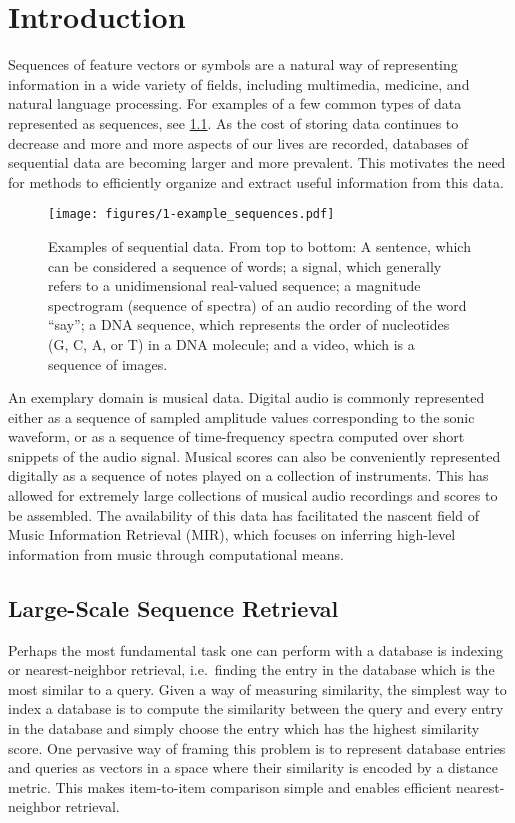 \chapter{Introduction}

Sequences of feature vectors or symbols are a natural way of representing information in a wide variety of fields, including multimedia, medicine, and natural language processing.
For examples of a few common types of data represented as sequences, see \cref{fig:example_sequences}.
As the cost of storing data continues to decrease and more and more aspects of our lives are recorded, databases of sequential data are becoming larger and more prevalent.
This motivates the need for methods to efficiently organize and extract useful information from this data.

\begin{figure}
  \texttt{[image: figures/1-example\_sequences.pdf]}
  \caption[Examples of sequential data]{Examples of sequential data.  From top to bottom: A sentence, which can be considered a sequence of words; a signal, which generally refers to a unidimensional real-valued sequence; a magnitude spectrogram (sequence of spectra) of an audio recording of the word ``say''; a DNA sequence, which represents the order of nucleotides (G, C, A, or T) in a DNA molecule; and a video, which is a sequence of images.}
  \label{fig:example_sequences}
\end{figure}

An exemplary domain is musical data.
Digital audio is commonly represented either as a sequence of sampled amplitude values corresponding to the sonic waveform, or as a sequence of time-frequency spectra computed over short snippets of the audio signal.
Musical scores can also be conveniently represented digitally as a sequence of notes played on a collection of instruments.
This has allowed for extremely large collections of musical audio recordings and scores to be assembled.
The availability of this data has facilitated the nascent field of Music Information Retrieval (MIR), which focuses on inferring high-level information from music through computational means.

\cite{}

\section{Large-Scale Sequence Retrieval}

Perhaps the most fundamental task one can perform with a database is indexing or nearest-neighbor retrieval, i.e.\ finding the entry in the database which is the most similar to a query.
Given a way of measuring similarity, the simplest way to index a database is to compute the similarity between the query and every entry in the database and simply choose the entry which has the highest similarity score.
One pervasive way of framing this problem is to represent database entries and queries as vectors in a space where their similarity is encoded by a distance metric.
This makes item-to-item comparison simple and enables efficient nearest-neighbor retrieval.

